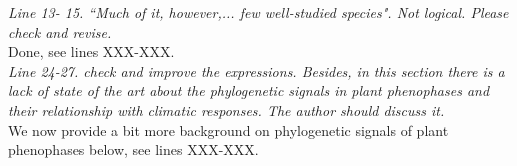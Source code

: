 \documentclass[11pt]{article}
\begin{document}
\emph{Line 13- 15. ``Much of it, however,... few well-studied species". Not logical. Please check and revise.}\\
Done, see lines XXX-XXX.\\

\emph{Line 24-27. check and improve the expressions. Besides, in this section there is a lack of state of the art about the phylogenetic signals in plant phenophases and their relationship with climatic responses. The author should discuss it.}\\
We now provide a bit more background on phylogenetic signals of plant phenophases below, see lines XXX-XXX.
\\
\end{document}
